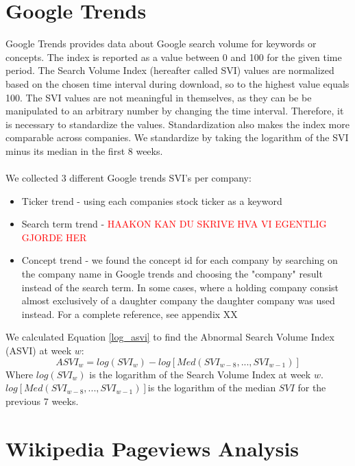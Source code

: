 \section{Google Trends}
Google Trends provides data about Google search volume for keywords or concepts. The index is reported as a value between 0 and 100 for the given time period. The Search Volume Index (hereafter called SVI) values are normalized based on the chosen time interval during download, so to the highest value equals 100. The SVI values are not meaningful in themselves, as they can be be manipulated to an arbitrary number by changing the time interval. Therefore, it is necessary to standardize the values. Standardization also makes the index more comparable across companies. We standardize by taking the logarithm of the SVI minus its median in the first 8 weeks. 
\\\\
We collected 3 different Google trends SVI's per company:
\begin{itemize}
\item Ticker trend - using each companies stock ticker as a keyword
\item Search term trend - \textcolor{red}{ HAAKON KAN DU SKRIVE HVA VI EGENTLIG GJORDE HER}
\item Concept trend - we found the concept id for each company by searching on the company name in Google trends and choosing the "company" result instead of the search term. In some cases, where a holding company consist almost exclusively of a daughter company the daughter company was used instead. For a complete reference, see appendix XX
\end{itemize}

We calculated Equation \eqref{log_asvi} to find the Abnormal Search Volume Index (ASVI) at week $w$:
\begin{equation}
   \label{log_asvi} 
   ASVI_{w} = log(SVI_{w}) - log[Med(SVI_{w-8},...,SVI_{w-1})] 
\end{equation}
Where $log(SVI_{w})$ is the logarithm of the Search Volume Index at week $w$. $log[Med(SVI_{w-8},...,SVI_{w-1})]$is the logarithm of the median $SVI$ for the previous 7 weeks.

\section{Wikipedia Pageviews Analysis}

